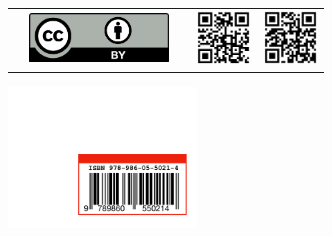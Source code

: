 \begin{tabular}{p{2.5cm}p{3cm}p{1.0cm}p{1.6cm}p{1.6cm}}
    & \includegraphics[width=10em]{images/ccby40.png} & &
    \includegraphics[width=1.4cm]{images/tesri.png} &
    \includegraphics[width=1.4cm]{images/tsps.png} \\
\end{tabular}
\clearpage
\thispagestyle{empty}
\hfill
\vfill
{\raggedright\vfill
   \hfill\includegraphics[width=5cm]{images/isbn_final.pdf}
}
